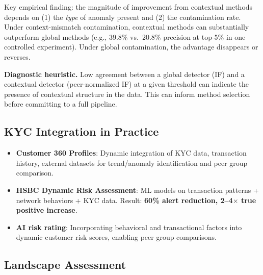 \documentclass[11pt]{article}
\begin{document}
Key empirical finding: the magnitude of improvement from contextual methods depends on (1) the \textit{type} of anomaly present and (2) the contamination rate. Under context-mismatch contamination, contextual methods can substantially outperform global methods (e.g., 39.8\% vs.\ 20.8\% precision at top-5\% in one controlled experiment). Under global contamination, the advantage disappears or reverses.

\textbf{Diagnostic heuristic.} Low agreement between a global detector (IF) and a contextual detector (peer-normalized IF) at a given threshold can indicate the presence of contextual structure in the data. This can inform method selection before committing to a full pipeline.

\subsection{KYC Integration in Practice}

\begin{itemize}
\item \textbf{Customer 360 Profiles}: Dynamic integration of KYC data, transaction history, external datasets for trend/anomaly identification and peer group comparison.
\item \textbf{HSBC Dynamic Risk Assessment}: ML models on transaction patterns + network behaviors + KYC data. Result: \textbf{60\% alert reduction, 2--4$\times$ true positive increase}.
\item \textbf{AI risk rating}: Incorporating behavioral and transactional factors into dynamic customer risk scores, enabling peer group comparisons.
\end{itemize}

\subsection{Landscape Assessment}
\end{document}
